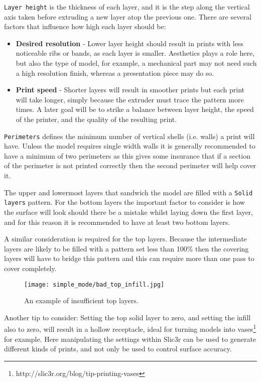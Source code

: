 \texttt{Layer height} is the thickness of each layer, and it is the step along the vertical axis taken before extruding a new layer atop the previous one.  There are several factors that influence how high each layer should be:
\begin{itemize}
	\item \textbf{Desired resolution}  - Lower layer height should result in prints with less noticeable ribs or bands, as each layer is smaller.  Aesthetics plays a role here, but also the type of model, for example, a mechanical part may not need such a high resolution finish, whereas a presentation piece may do so.
	\item \textbf{Print speed}  - Shorter layers will result in smoother prints but each print will take longer, simply because the extruder must trace the pattern more times.  A later goal will be to strike a balance between layer height, the speed of the printer, and the quality of the resulting print.
\end{itemize}
\texttt{Perimeters} defines the minimum number of vertical shells (i.e. walls) a print will have.  Unless the model requires single width walls it is generally recommended to have a minimum of two perimeters as this gives some insurance that if a section of the perimeter is not printed correctly then the second perimeter will help cover it.

The upper and lowermost layers that sandwich the model are filled with a \texttt{Solid layers} pattern.  For the bottom layers the important factor to consider is how the surface will look should there be a mistake whilst laying down the first layer, and for this reason it is recommended to have at least two bottom layers.

A similar consideration is required for the top layers.  Because the intermediate layers are likely to be filled with a pattern set less than 100\% then the covering layers will have to bridge this pattern and this can require more than one pass to cover completely.

\begin{figure}[H]
\centering
\texttt{[image: simple\_mode/bad\_top\_infill.jpg]}
\caption{An example of insufficient top layers.}
\label{fig:bad_top_infill}
\end{figure}

Another tip to consider: Setting the top solid layer to zero, and setting the infill also to zero, will result in a hollow receptacle, ideal for turning models into vases\footnote{http://slic3r.org/blog/tip-printing-vases} for example.  Here manipulating the settings within Slic3r can be used to generate different kinds of prints, and not only be used to control surface accuracy.

